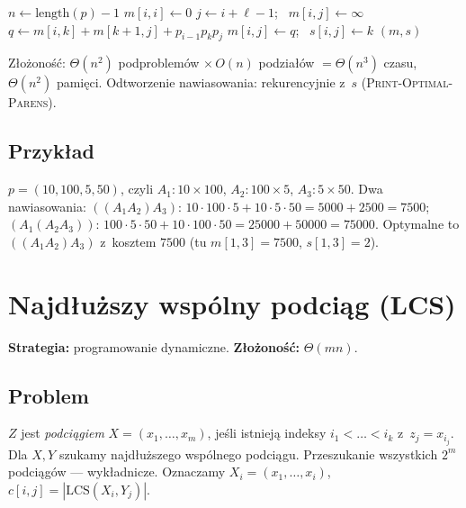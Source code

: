 \documentclass[11pt,a4paper]{article}
\theoremstyle{plain}
\theoremstyle{definition}
\begin{document}
\begin{algorithm}[H]
\caption{Matrix-Chain-Order($p$)}
\begin{algorithmic}[1]
\State $n\gets \mathrm{length}(p)-1$
 $m[i,i]\gets 0$ \EndFor
{} 
     \State $j\gets i+\ell-1$; \ $m[i,j]\gets\infty$
        \State $q\gets m[i,k]+m[k+1,j]+p_{i-1}p_k p_j$
         $m[i,j]\gets q$; \ $s[i,j]\gets k$ \EndIf
     \EndFor
  \EndFor
\EndFor
\State \Return $(m,s)$
\end{algorithmic}
\end{algorithm}
Złożoność: $\Theta(n^2)$ podproblemów $\times\,O(n)$ podziałów $=\Theta(n^3)$ czasu, $\Theta(n^2)$ pamięci.
Odtworzenie nawiasowania: rekurencyjnie z~$s$ (\textsc{Print-Optimal-Parens}).

\subsection*{Przykład}
$p=(10,100,5,50)$, czyli $A_1{:}10\times100$, $A_2{:}100\times5$, $A_3{:}5\times50$.
Dwa nawiasowania:
$((A_1A_2)A_3)$: $10\cdot100\cdot5+10\cdot5\cdot50=5000+2500=7500$;
$(A_1(A_2A_3))$: $100\cdot5\cdot50+10\cdot100\cdot50=25000+50000=75000$.
Optymalne to $((A_1A_2)A_3)$ z~kosztem $7500$ (tu $m[1,3]=7500$, $s[1,3]=2$).

\section{Najdłuższy wspólny podciąg (LCS)}\label{sec:lcs}
\textbf{Strategia:} programowanie dynamiczne. \quad\textbf{Złożoność:} $\Theta(mn)$.

\subsection*{Problem}
$Z$ jest \emph{podciągiem} $X=(x_1,\dots,x_m)$, jeśli istnieją indeksy $i_1<\dots<i_k$ z~$z_j=x_{i_j}$.
Dla $X,Y$ szukamy najdłuższego wspólnego podciągu. Przeszukanie wszystkich $2^m$ podciągów --- wykładnicze.
Oznaczamy $X_i=(x_1,\dots,x_i)$, $c[i,j]=|\mathrm{LCS}(X_i,Y_j)|$.
\end{document}
